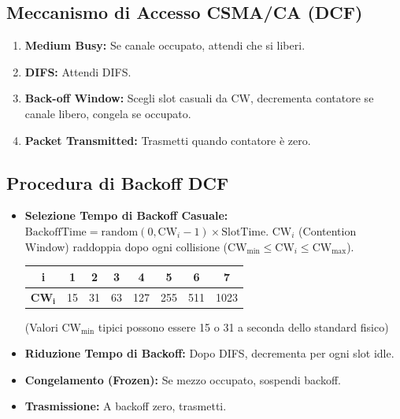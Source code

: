 \subsection{Meccanismo di Accesso CSMA/CA (DCF)}
\begin{enumerate}
    \item \textbf{Medium Busy:} Se canale occupato, attendi che si liberi.
    \item \textbf{DIFS:} Attendi DIFS.
    \item \textbf{Back-off Window:} Scegli slot casuali da CW, decrementa contatore se canale libero, congela se occupato.
    \item \textbf{Packet Transmitted:} Trasmetti quando contatore è zero.
\end{enumerate}

\subsection{Procedura di Backoff DCF}
\begin{itemize}
    \item \textbf{Selezione Tempo di Backoff Casuale:} $\text{BackoffTime} = \text{random}(0, \text{CW}_i - 1) \times \text{SlotTime}$.
    $\text{CW}_i$ (Contention Window) raddoppia dopo ogni collisione ($\text{CW}_{\min} \le \text{CW}_i \le \text{CW}_{\max}$).
    \begin{center}
    \begin{tabular}{|c|c|c|c|c|c|c|c|}
        \hline
        \textbf{i} & 1 & 2 & 3 & 4 & 5 & 6 & 7 \\ \hline
        $\mathbf{CW_i}$ & 15 & 31 & 63 & 127 & 255 & 511 & 1023 \\ \hline
    \end{tabular}
    \end{center}
    (Valori $\text{CW}_{\min}$ tipici possono essere 15 o 31 a seconda dello standard fisico)
    \item \textbf{Riduzione Tempo di Backoff:} Dopo DIFS, decrementa per ogni slot idle.
    \item \textbf{Congelamento (Frozen):} Se mezzo occupato, sospendi backoff.
    \item \textbf{Trasmissione:} A backoff zero, trasmetti.
\end{itemize}

